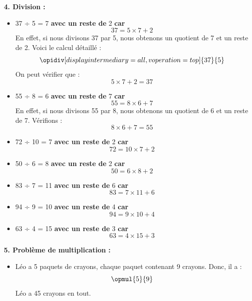 \documentclass{article}
\begin{document}
\begin{tcolorbox}[colback=green!10!white, colframe=green!75!black, sharp corners=south, boxrule=0.8mm, title=Corrections]

   \textbf{4. Division :}
\begin{itemize}
\item 37 ÷ 5 = 7 \textbf{ avec un reste de } 2 \textbf{ car } 
    \[
    37 = 5 \times 7 + 2
    \]
    En effet, si nous divisons 37 par 5, nous obtenons un quotient de 7 et un reste de 2. Voici le calcul détaillé :
    \[
    \opidiv[displayintermediary=all,voperation=top]{37}{5}
    \]
    On peut vérifier que :
    \[
    5 \times 7 + 2 = 37
    \]
    \item 55 ÷ 8 = 6 \textbf{ avec un reste de } 7 \textbf{ car } 
    \[
    55 = 8 \times 6 + 7
    \]
    En effet, si nous divisons 55 par 8, nous obtenons un quotient de 6 et un reste de 7. Vérifions :
    \[
    8 \times 6 + 7 = 55
    \]
    \item 72 ÷ 10 = 7 \textbf{ avec un reste de } 2 \textbf{ car }
    \[
    72 = 10 \times 7 + 2
    \]
    \item 50 ÷ 6 = 8 \textbf{ avec un reste de } 2 \textbf{ car }
    \[
    50 = 6 \times 8 + 2
    \]
    \item 83 ÷ 7 = 11 \textbf{ avec un reste de } 6 \textbf{ car }
    \[
    83 = 7 \times 11 + 6
    \]
    \item 94 ÷ 9 = 10 \textbf{ avec un reste de } 4 \textbf{ car }
    \[
    94 = 9 \times 10 + 4
    \]
    \item 63 ÷ 4 = 15 \textbf{ avec un reste de } 3 \textbf{ car }
    \[
    63 = 4 \times 15 + 3
    \]
\end{itemize}


    \textbf{5. Problème de multiplication :}
    \begin{itemize}
        \item Léo a 5 paquets de crayons, chaque paquet contenant 9 crayons. Donc, il a :
        \[
        \opmul{5}{9} 
        \]
        Léo a 45 crayons en tout.
    \end{itemize}
\end{tcolorbox}
\end{document}
